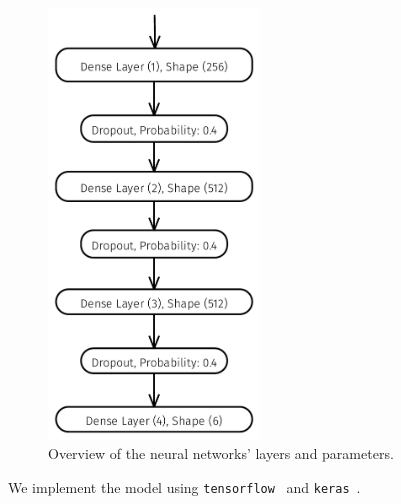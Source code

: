 \documentclass[
  12pt,
  bibliography=totoc,     %
  captions=tableheading,  %
  titlepage=firstiscover, %
]{scrartcl}
\begin{document}
\begin{figure}[H]
\begin{minipage}{0.49\textwidth}
        \includegraphics[width=0.5\textwidth]{figures/Network.pdf}
        \normalsize
    \end{minipage}\hfill
  \caption{Overview of the neural networks' layers and parameters.}
  \label{fig:nn_layers}
\end{figure}
\noindent
We implement the model using \texttt{tensorflow}~\cite{tensorflow} and \texttt{keras}~\cite{keras}.
\end{document}
